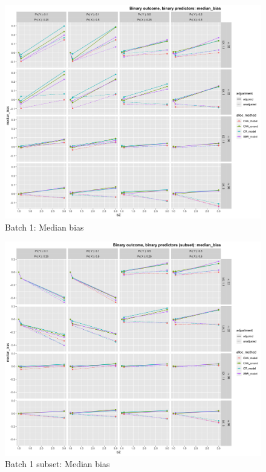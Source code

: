\begin{figure}[H]
	\includegraphics[width=\linewidth]{figures/b1_median_bias_all_methods_adj_unadj}
	\caption{Batch 1: Median bias}
	\label{fig:b1mb}
\end{figure}

\begin{figure}[H]
	\includegraphics[width=\linewidth]{figures/b1_sub_median_bias_all_methods_adj_unadj}
	\caption{Batch 1 subset: Median bias}
	\label{fig:b1smb}
\end{figure}

